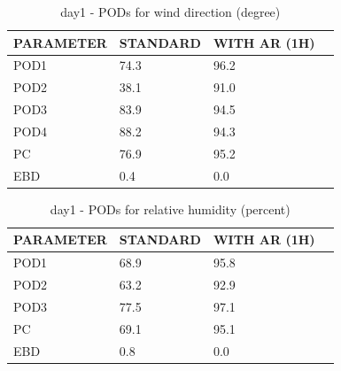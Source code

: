 \begin{table}[p!]
\begin{center}
\begin{tabular}{|l|l|l|l|}
\hline
\multicolumn{1}{|c|}{\cellcolor[HTML]{C0C0C0}\textbf{PARAMETER}} & \multicolumn{1}{c|}{\cellcolor[HTML]{C0C0C0}\textbf{STANDARD}} & \multicolumn{1}{c|}{\cellcolor[HTML]{C0C0C0}\textbf{WITH AR (1H)}} \\
\hline
\cellcolor[HTML]{C0C0C0}POD1  & 74.3      & 96.2     \\
\cellcolor[HTML]{C0C0C0}POD2  & 38.1      & 91.0     \\
\cellcolor[HTML]{C0C0C0}POD3  & 83.9      & 94.5     \\
\cellcolor[HTML]{C0C0C0}POD4  & 88.2      & 94.3     \\
\cellcolor[HTML]{C0C0C0}PC    & 76.9        & 95.2       \\
\cellcolor[HTML]{C0C0C0}EBD   & 0.4       & 0.0      \\
\hline
\end{tabular}
\caption{day1 - PODs for wind direction (degree)}
\label{tab:podwd:day1}
\end{center}
\end{table}
\begin{table}[p!]
\begin{center}
\begin{tabular}{|l|l|l|l|}
\hline
\multicolumn{1}{|c|}{\cellcolor[HTML]{C0C0C0}\textbf{PARAMETER}} & \multicolumn{1}{c|}{\cellcolor[HTML]{C0C0C0}\textbf{STANDARD}} & \multicolumn{1}{c|}{\cellcolor[HTML]{C0C0C0}\textbf{WITH AR (1H)}} \\
\hline
\cellcolor[HTML]{C0C0C0}POD1  & 68.9                                & 95.8         \\
\cellcolor[HTML]{C0C0C0}POD2  & 63.2                                & 92.9         \\
\cellcolor[HTML]{C0C0C0}POD3  & 77.5                                & 97.1         \\
\cellcolor[HTML]{C0C0C0}PC    & 69.1                                  & 95.1           \\
\cellcolor[HTML]{C0C0C0}EBD   & 0.8                                 & 0.0          \\
\hline
\end{tabular}
\caption{day1 - PODs for relative humidity (percent)}
\label{tab:podrh:day1}
\end{center}
\end{table}
